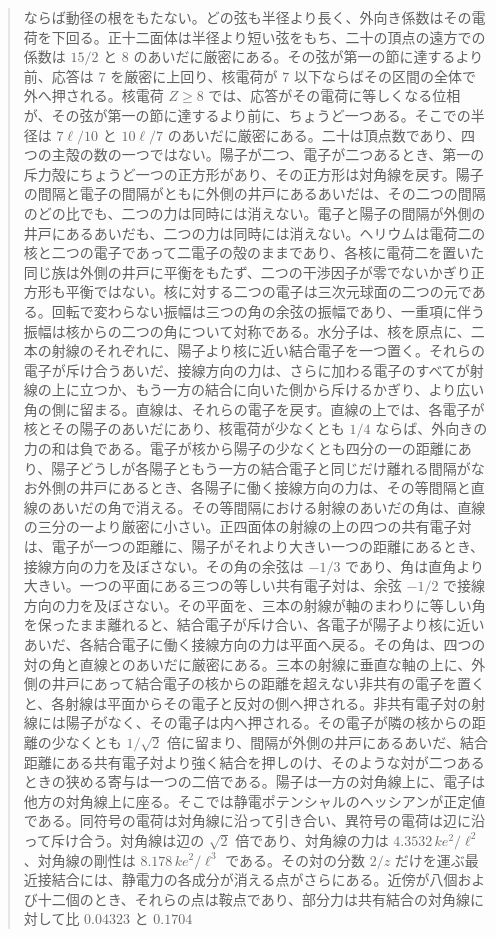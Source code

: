 \documentclass[a4paper]{article}
\begin{document}
\begin{abstract}
ならば動径の根をもたない。どの弦も半径より長く、外向き係数はその電荷を下回る。正十二面体は半径より短い弦をもち、二十の頂点の遠方での係数は \(15/2\) と \(8\) のあいだに厳密にある。その弦が第一の節に達するより前、応答は \(7\) を厳密に上回り、核電荷が \(7\) 以下ならばその区間の全体で外へ押される。核電荷 \(Z\ge 8\) では、応答がその電荷に等しくなる位相が、その弦が第一の節に達するより前に、ちょうど一つある。そこでの半径は \(7\ell/10\) と \(10\ell/7\) のあいだに厳密にある。二十は頂点数であり、四つの主殻の数の一つではない。陽子が二つ、電子が二つあるとき、第一の斥力殻にちょうど一つの正方形があり、その正方形は対角線を戻す。陽子の間隔と電子の間隔がともに外側の井戸にあるあいだは、その二つの間隔のどの比でも、二つの力は同時には消えない。電子と陽子の間隔が外側の井戸にあるあいだも、二つの力は同時には消えない。ヘリウムは電荷二の核と二つの電子であって二電子の殻のままであり、各核に電荷二を置いた同じ族は外側の井戸に平衡をもたず、二つの干渉因子が零でないかぎり正方形も平衡ではない。核に対する二つの電子は三次元球面の二つの元である。回転で変わらない振幅は三つの角の余弦の振幅であり、一重項に伴う振幅は核からの二つの角について対称である。水分子は、核を原点に、二本の射線のそれぞれに、陽子より核に近い結合電子を一つ置く。それらの電子が斥け合うあいだ、接線方向の力は、さらに加わる電子のすべてが射線の上に立つか、もう一方の結合に向いた側から斥けるかぎり、より広い角の側に留まる。直線は、それらの電子を戻す。直線の上では、各電子が核とその陽子のあいだにあり、核電荷が少なくとも \(1/4\) ならば、外向きの力の和は負である。電子が核から陽子の少なくとも四分の一の距離にあり、陽子どうしが各陽子ともう一方の結合電子と同じだけ離れる間隔がなお外側の井戸にあるとき、各陽子に働く接線方向の力は、その等間隔と直線のあいだの角で消える。その等間隔における射線のあいだの角は、直線の三分の一より厳密に小さい。正四面体の射線の上の四つの共有電子対は、電子が一つの距離に、陽子がそれより大きい一つの距離にあるとき、接線方向の力を及ぼさない。その角の余弦は \(-1/3\) であり、角は直角より大きい。一つの平面にある三つの等しい共有電子対は、余弦 \(-1/2\) で接線方向の力を及ぼさない。その平面を、三本の射線が軸のまわりに等しい角を保ったまま離れると、結合電子が斥け合い、各電子が陽子より核に近いあいだ、各結合電子に働く接線方向の力は平面へ戻る。その角は、四つの対の角と直線とのあいだに厳密にある。三本の射線に垂直な軸の上に、外側の井戸にあって結合電子の核からの距離を超えない非共有の電子を置くと、各射線は平面からその電子と反対の側へ押される。非共有電子対の射線には陽子がなく、その電子は内へ押される。その電子が隣の核からの距離の少なくとも \(1/\sqrt{2}\) 倍に留まり、間隔が外側の井戸にあるあいだ、結合距離にある共有電子対より強く結合を押しのけ、そのような対が二つあるときの狭める寄与は一つの二倍である。陽子は一方の対角線上に、電子は他方の対角線上に座る。そこでは静電ポテンシャルのヘッシアンが正定値である。同符号の電荷は対角線に沿って引き合い、異符号の電荷は辺に沿って斥け合う。対角線は辺の \(\sqrt{2}\) 倍であり、対角線の力は \(4.3532\,k e^{2}/\ell^{2}\)、対角線の剛性は \(8.178\,k e^{2}/\ell^{3}\) である。その対の分数 \(2/z\) だけを運ぶ最近接結合には、静電力の各成分が消える点がさらにある。近傍が八個および十二個のとき、それらの点は鞍点であり、部分力は共有結合の対角線に対して比 \(0.04323\) と \(0.1704\) 
\end{abstract}
\end{document}
